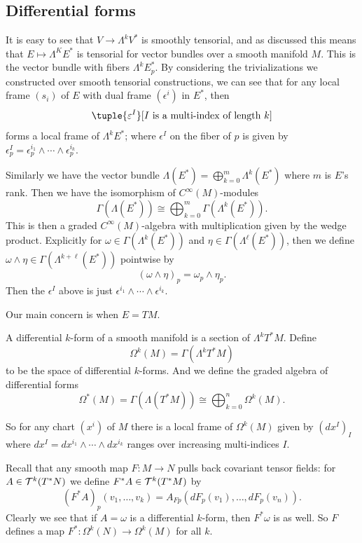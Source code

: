 \eproof

\subsection{Differential forms}

It is easy to see that $V\to\Lambda^kV^*$ is smoothly tensorial, and as discussed this means that $E\mapsto\Lambda^KE^*$ is tensorial for vector bundles over a smooth manifold $M$.
This is the vector bundle with fibers $\Lambda^kE^*_p$.
By considering the trivializations we constructed over smooth tensorial constructions, we can see that for any local frame $(s_i)$ of $E$ with dual frame $(\epsilon^i)$ in $E^*$,
then
$$ \tuple{\epsilon^I}[\hbox{$I$ is a multi-index of length $k$}] $$
forms a local frame of $\Lambda^kE^*$; where $\epsilon^I$ on the fiber of $p$ is given by $\epsilon^I_p=\epsilon^{i_1}_p\wedge\cdots\wedge\epsilon^{i_k}_p$.

Similarly we have the vector bundle $\Lambda(E^*)=\bigoplus_{k=0}^m\Lambda^k(E^*)$ where $m$ is $E$'s rank.
Then we have the isomorphism of $C^\infty(M)$-modules
$$ \Gamma(\Lambda(E^*)) \cong \bigoplus_{k=0}^m\Gamma(\Lambda^k(E^*)) . $$
This is then a graded $C^\infty(M)$-algebra with multiplication given by the wedge product.
Explicitly for $\omega\in\Gamma(\Lambda^k(E^*))$ and $\eta\in\Gamma(\Lambda^\ell(E^*))$, then we define $\omega\wedge\eta\in\Gamma(\Lambda^{k+\ell}(E^*))$ pointwise by
$$ (\omega\wedge\eta)_p = \omega_p\wedge\eta_p . $$
Then the $\epsilon^I$ above is just $\epsilon^{i_1}\wedge\cdots\wedge\epsilon^{i_k}$.

Our main concern is when $E=TM$.

\bdefn

    A {\emphcolor differential $k$-form} of a smooth manifold is a section of $\Lambda^kT^*M$.
    Define
    $$ \Omega^k(M) = \Gamma(\Lambda^kT^*M) $$
    to be the space of differential $k$-forms.
    And we define the graded algebra of differential forms
    $$ \Omega^*(M) = \Gamma(\Lambda(T^*M)) \cong \bigoplus_{k=0}^n\Omega^k(M) . $$

\edefn

So for any chart $(x^i)$ of $M$ there is a local frame of $\Omega^k(M)$ given by $(dx^I)_I$ where $dx^I=dx^{i_1}\wedge\cdots\wedge dx^{i_k}$ ranges over increasing multi-indices $I$.

Recall that any smooth map $F\colon M\to N$ pulls back covariant tensor fields: for $A\in{{\cal T}}^k(T^*N)$ we define $F^*A\in{{\cal T}}^k(T^*M)$ by
$$ (F^*A)_p(v_1,\dots,v_k) = A_{Fp}(dF_p(v_1),\dots,dF_p(v_n)) . $$
Clearly we see that if $A=\omega$ is a differential $k$-form, then $F^*\omega$ is as well.
So $F$ defines a map $F^*\colon\Omega^k(N)\to\Omega^k(M)$ for all $k$.

